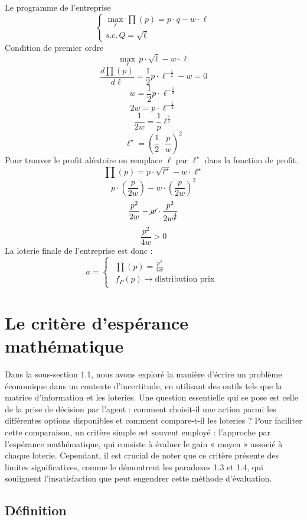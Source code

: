 \documentclass[a4paper, 12pt]{report}
\begin{document}
Le programme de l'entreprise
$$
\begin{cases}\underset{\ell}\max \,\prod(p)=p\cdot q - w \cdot \ell \\ s.c. \, Q=\sqrt{\ell}\end{cases}
$$
Condition de premier ordre 
$$
\underset{\ell}\max \, p \cdot \sqrt{\ell}-w\cdot\ell
$$
$$
\frac{d \prod(p)}{d \ell}=\frac{1}{2}p\cdot \ell^{-\frac{1}{2}}-w=0
$$
$$
w=\frac{1}{2}p\cdot \ell^{-\frac{1}{2}}
$$
$$
2w=p\cdot \ell^{-\frac{1}{2}}
$$
$$
\frac{1}{2w}=\frac{1}{p}\ell^{\frac{1}{2}}
$$
$$
\ell^{\star}=\left( \frac{1}{2}\cdot\frac{p}{w}\right)^2
$$
Pour trouver le profit aléatoire on remplace $\ell$ par $\ell^{\star}$ dans la fonction de profit. 
$$
\prod(p)=p\cdot \sqrt{\ell^{\star}}-w\cdot\ell^{\star}
$$
$$
p\cdot \left( \frac{p}{2w} \right)-w\cdot\left( \frac{p}{2w} \right)^2
$$
$$
\frac{p^2}{2w}-\cancel{w}\cdot \frac{p^2}{2w^{\cancel{2}}}
$$
$$
\frac{p^2}{4w}>0
$$
La loterie finale de l'entreprise est donc :
$$
a=\begin{cases}\begin{matrix}\prod(p)=\frac{p^2}{4w}\\ f_P(p)\to \text{distribution prix}\end{matrix}\end{cases}
$$

\section{Le critère d'espérance mathématique}

Dans la sous-section 1.1, nous avons exploré la manière d'écrire un problème économique dans un contexte d'incertitude, en utilisant des outils tels que la matrice d'information et les loteries. Une question essentielle qui se pose est celle de la prise de décision par l'agent : comment choisit-il une action parmi les différentes options disponibles et comment compare-t-il les loteries ? Pour faciliter cette comparaison, un critère simple est souvent employé : l'approche par l'espérance mathématique, qui consiste à évaluer le gain « moyen » associé à chaque loterie. Cependant, il est crucial de noter que ce critère présente des limites significatives, comme le démontrent les paradoxes 1.3 et 1.4, qui soulignent l'insatisfaction que peut engendrer cette méthode d'évaluation.

\subsection{Définition}
\end{document}
